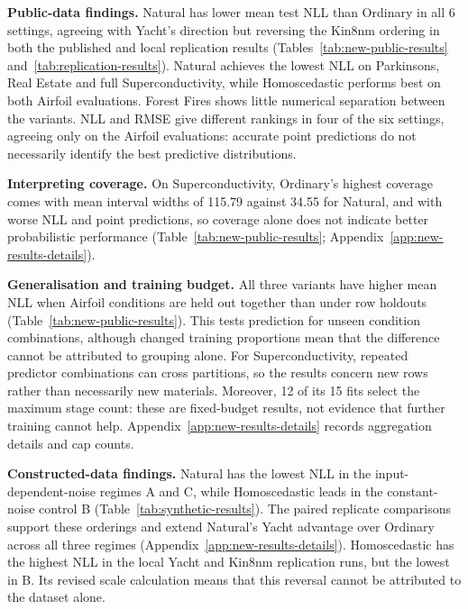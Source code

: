 \textbf{Public-data findings.}
Natural has lower mean test NLL than Ordinary in all 6 settings, agreeing with Yacht's direction but reversing the Kin8nm ordering in both the published and local replication results (Tables~\ref{tab:new-public-results} and~\ref{tab:replication-results}).
Natural achieves the lowest NLL on Parkinsons, Real Estate and full Superconductivity, while Homoscedastic performs best on both Airfoil evaluations.
Forest Fires shows little numerical separation between the variants.
NLL and RMSE give different rankings in four of the six settings, agreeing only on the Airfoil evaluations: accurate point predictions do not necessarily identify the best predictive distributions.

\textbf{Interpreting coverage.}
On Superconductivity, Ordinary's highest coverage comes with mean interval widths of 115.79 against 34.55 for Natural, and with worse NLL and point predictions, so coverage alone does not indicate better probabilistic performance (Table~\ref{tab:new-public-results}; Appendix~\ref{app:new-results-details}).

\textbf{Generalisation and training budget.}
All three variants have higher mean NLL when Airfoil conditions are held out together than under row holdouts (Table~\ref{tab:new-public-results}).
This tests prediction for unseen condition combinations, although changed training proportions mean that the difference cannot be attributed to grouping alone.
For Superconductivity, repeated predictor combinations can cross partitions, so the results concern new rows rather than necessarily new materials.
Moreover, 12 of its 15 fits select the maximum stage count: these are fixed-budget results, not evidence that further training cannot help.
Appendix~\ref{app:new-results-details} records aggregation details and cap counts.

\textbf{Constructed-data findings.}
Natural has the lowest NLL in the input-dependent-noise regimes A and C, while Homoscedastic leads in the constant-noise control B (Table~\ref{tab:synthetic-results}).
The paired replicate comparisons support these orderings and extend Natural's Yacht advantage over Ordinary across all three regimes (Appendix~\ref{app:new-results-details}).
Homoscedastic has the highest NLL in the local Yacht and Kin8nm replication runs, but the lowest in B.
Its revised scale calculation means that this reversal cannot be attributed to the dataset alone.

